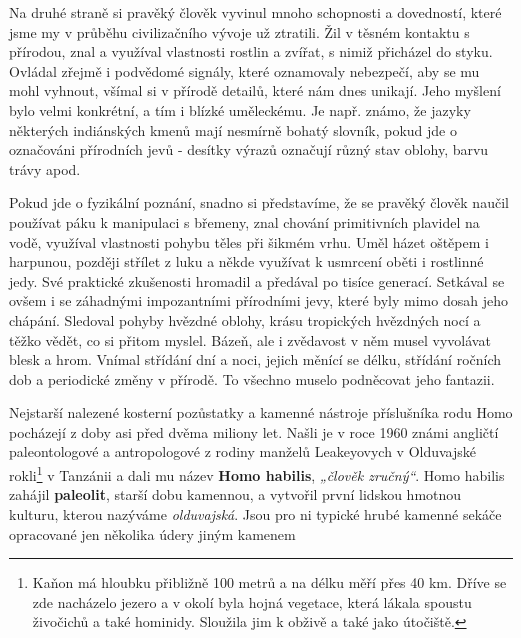         Na druhé straně si pravěký člověk vyvinul mnoho schopnosti a dovedností, které jsme my v
        průběhu civilizačního vývoje už ztratili. Žil v těsném kontaktu s přírodou, znal a využíval
        vlastnosti rostlin a zvířat, s nimiž přicházel do styku. Ovládal zřejmě i podvědomé signály,
        které oznamovaly nebezpečí, aby se mu mohl vyhnout, všímal si v přírodě detailů, které nám
        dnes unikají. Jeho myšlení bylo velmi konkrétní, a tím i blízké uměleckému. Je např. známo,
        že jazyky některých indiánských kmenů mají nesmírně bohatý slovník, pokud jde o označováni
        přírodních jevů - desítky výrazů označují různý stav oblohy, barvu trávy apod.


        Pokud jde o fyzikální poznání, snadno si představíme, že se pravěký člověk naučil používat
        páku k manipulaci s břemeny, znal chování primitivních plavidel na vodě, využíval vlastnosti
        pohybu těles při šikmém vrhu. Uměl házet oštěpem i harpunou, později střílet z luku a někde
        využívat k usmrcení oběti i rostlinné jedy. Své praktické zkušenosti hromadil a předával po
        tisíce generací. Setkával se ovšem i se záhadnými impozantními přírodními jevy, které byly
        mimo dosah jeho chápání. Sledoval pohyby hvězdné oblohy, krásu tropických hvězdných nocí a
        těžko vědět, co si přitom myslel. Bázeň, ale i zvědavost v něm musel vyvolávat blesk a hrom.
        Vnímal střídání dní a noci, jejich měnící se délku, střídání ročních dob a periodické změny
        v přírodě. To všechno muselo podněcovat jeho fantazii.

        Nejstarší nalezené kosterní pozůstatky a kamenné nástroje příslušníka rodu Homo pocházejí z
        doby asi před dvěma miliony let. Našli je v roce 1960 známi angličtí paleontologové a
        antropologové z rodiny manželů Leakeyovych v Olduvajské rokli\footnote{Kaňon má hloubku
        přibližně 100 metrů a na délku měří přes 40 km. Dříve se zde nacházelo jezero a v okolí byla
        hojná vegetace, která lákala spoustu živočichů a také hominidy. Sloužila jim k obživě a také
        jako útočiště.} v Tanzánii a dali mu název \textbf{Homo habilis}, \emph{„člověk zručný“}.
        Homo habilis zahájil \textbf{paleolit}, starší dobu kamennou, a vytvořil první lidskou
        hmotnou kulturu, kterou nazýváme \emph{olduvajská}. Jsou pro ni typické hrubé kamenné sekáče
        opracované jen několika údery jiným kamenem 

